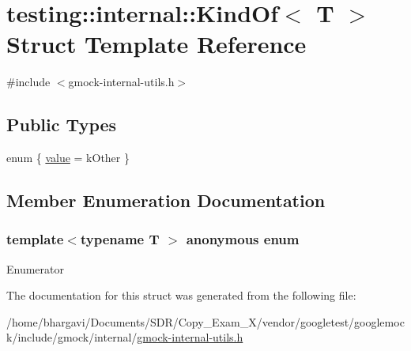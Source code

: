 \hypertarget{structtesting_1_1internal_1_1_kind_of}{}\section{testing\+:\+:internal\+:\+:Kind\+Of$<$ T $>$ Struct Template Reference}
\label{structtesting_1_1internal_1_1_kind_of}


{\ttfamily \#include $<$gmock-\/internal-\/utils.\+h$>$}

\subsection*{Public Types}
\begin{DoxyCompactItemize}
\item 
enum \{ \hyperlink{structtesting_1_1internal_1_1_kind_of_a4866389a4bc8d5522b5f8ae61a42f520a30d28b30579739dfb2d410825ac3aaa8}{value} = k\+Other
 \}
\end{DoxyCompactItemize}


\subsection{Member Enumeration Documentation}
\subsubsection[{\texorpdfstring{anonymous enum}{anonymous enum}}]{\setlength{\rightskip}{0pt plus 5cm}template$<$typename T $>$ anonymous enum}\hypertarget{structtesting_1_1internal_1_1_kind_of_a4866389a4bc8d5522b5f8ae61a42f520}{}\label{structtesting_1_1internal_1_1_kind_of_a4866389a4bc8d5522b5f8ae61a42f520}
\begin{Desc}
\item[Enumerator]\par
\begin{description}
\item[{\em 
value\hypertarget{structtesting_1_1internal_1_1_kind_of_a4866389a4bc8d5522b5f8ae61a42f520a30d28b30579739dfb2d410825ac3aaa8}{}\label{structtesting_1_1internal_1_1_kind_of_a4866389a4bc8d5522b5f8ae61a42f520a30d28b30579739dfb2d410825ac3aaa8}
}]\end{description}
\end{Desc}


The documentation for this struct was generated from the following file\+:\begin{DoxyCompactItemize}
\item 
/home/bhargavi/\+Documents/\+S\+D\+R/\+Copy\+\_\+\+Exam\+\_\+X/vendor/googletest/googlemock/include/gmock/internal/\hyperlink{gmock-internal-utils_8h}{gmock-\/internal-\/utils.\+h}\end{DoxyCompactItemize}
